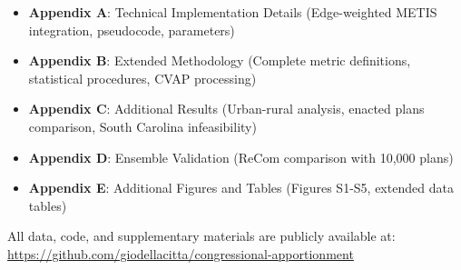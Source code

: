 \documentclass[12pt,letterpaper]{article}
\begin{document}
\begin{itemize}
    \item \textbf{Appendix A}: Technical Implementation Details (Edge-weighted METIS integration, pseudocode, parameters)
    \item \textbf{Appendix B}: Extended Methodology (Complete metric definitions, statistical procedures, CVAP processing)
    \item \textbf{Appendix C}: Additional Results (Urban-rural analysis, enacted plans comparison, South Carolina infeasibility)
    \item \textbf{Appendix D}: Ensemble Validation (ReCom comparison with 10,000 plans)
    \item \textbf{Appendix E}: Additional Figures and Tables (Figures S1-S5, extended data tables)
\end{itemize}

All data, code, and supplementary materials are publicly available at: \url{https://github.com/giodellacitta/congressional-apportionment}
\end{document}
